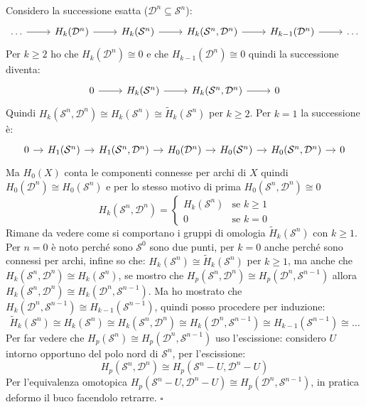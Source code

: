 \documentclass[10pt, twoside=false, x11names]{scrbook}
\newenvironment{proof}{{\textbf{Dimostrazione}:}}{\hfill $\square$}
\newcommand{\Sph}[1][]{\mathcal{S}^#1}
\newcommand{\Disk}[1][]{\mathcal{D}^#1}
\let\setminus-
\begin{document}
\begin{proof}
  Considero la successione esatta ($ \Disk{n} \subseteq \Sph{n} $):
  \[
    \begin{tikzcd}
      \dots \rar & H_k(\Disk{n}) \rar & H_k(\Sph{n}) \rar & H_k(\Sph{n}, \Disk{n}) \rar & H_{k-1}(\Disk{n}) \rar & \dots
    \end{tikzcd}
  \]
  Per $ k \geq 2 $ ho che $ H_k(\Disk{n}) \cong 0 $ e che $ H_{k-1}(\Disk{n}) \cong 0 $ quindi
  la successione diventa:
  \[
    \begin{tikzcd}
      0 \rar & H_k(\Sph{n}) \rar & H_k(\Sph{n}, \Disk{n}) \rar & 0
    \end{tikzcd}
  \]
  Quindi $ H_k(\Sph{n}, \Disk{n}) \cong H_k(\Sph{n}) \cong \tilde{H}_k(\Sph{n}) $ per $ k \geq 2 $.
  Per $ k = 1 $ la successione è:
  \[
    \begin{tikzcd}[nodes={column sep=10pt}]
      0 \rar & H_1(\Sph{n}) \rar & H_1(\Sph{n}, \Disk{n}) \rar & H_0(\Disk{n}) \rar & H_0(\Sph{n}) \rar & H_0(\Sph{n}, \Disk{n}) \rar & 0
    \end{tikzcd}
  \]
  Ma $ H_0(X) $ conta le componenti connesse per archi di $ X $ quindi $ H_0(\Disk{n}) \cong H_0(\Sph{n}) $
  e per lo stesso motivo di prima $ H_0(\Sph{n}, \Disk{n}) \cong 0$
  \[
    H_k(\Sph{n}, \Disk{n}) =
    \begin{cases}
      H_k(\Sph{n}) & \text{se } k \geq 1 \\
      0 & \text{se } k = 0
    \end{cases}
  \]
  Rimane da vedere come si comportano i gruppi di omologia $ \tilde{H}_k(\Sph{n}) $ con $ k \geq 1 $.
  Per $ n = 0 $ è noto perché sono $ \Sph{0} $ sono due punti, per $ k = 0 $ anche perché sono connessi
  per archi, infine so che: $ H_k(\Sph{n}) \cong \tilde{H}_k(\Sph{n}) $ per $ k \geq 1 $, ma anche
  che $ H_k(\Sph{n}, \Disk{n}) \cong H_k(\Sph{n}) $, se mostro che $ H_p(\Sph{n}, \Disk{n}) \cong H_p(\Disk{n}, \Sph{n-1}) $
  allora $ H_k(\Sph{n}, \Disk{n}) \cong H_k(\Disk{n}, \Sph{n-1}) $.
  Ma ho mostrato che $ H_k(\Disk{n}, \Sph{n-1}) \cong H_{k-1}(\Sph{n-1}) $, quindi posso procedere
  per induzione:
  \[
    \tilde{H}_k(\Sph{n}) \cong H_k(\Sph{n}) \cong H_k(\Sph{n}, \Disk{n}) \cong H_k(\Disk{n}, \Sph{n-1}) \cong H_{k-1}(\Sph{n-1}) \cong \dots
  \]
  Per far vedere che $ H_p(\Sph{n}) \cong H_p(\Disk{n}, \Sph{n-1}) $ uso l'escissione:
  considero $ U $ intorno opportuno del polo nord di $ \Sph{n} $, per l'escissione:
  \[
    H_p(\Sph{n}, \Disk{n}) \cong H_p(\Sph{n} \setminus U, \Disk{n} \setminus U )
  \]
  Per l'equivalenza omotopica $  H_p(\Sph{n} \setminus U, \Disk{n} \setminus U ) \cong H_p(\Disk{n}, \Sph{n-1}) $, in pratica
  deformo il buco facendolo retrarre.
\end{proof}
\end{document}
